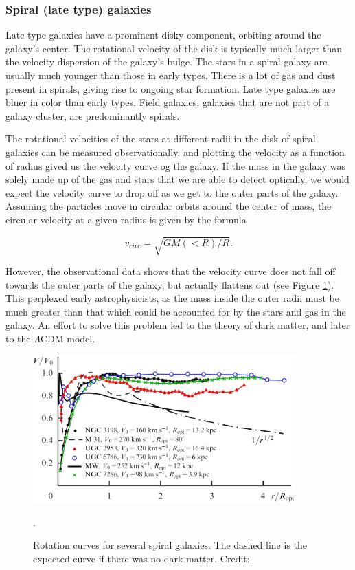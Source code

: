\subsubsection{Spiral (late type) galaxies} \label{earlies}
Late type galaxies have a prominent disky component, orbiting around the galaxy's center. The rotational velocity of the disk is typically much larger than the velocity dispersion of the galaxy's bulge. The stars in a spiral galaxy are usually much younger than those in early types. There is a lot of gas and dust present in spirals, giving rise to ongoing star formation. Late type galaxies are bluer in color than early types. Field galaxies, galaxies that are not part of a galaxy cluster, are predominantly spirals. 


The rotational velocities of the stars at different radii in the disk of spiral galaxies can be measured observationally, and plotting the velocity as a function of radius gived us the velocity curve og the galaxy. If the mass in the galaxy was solely made up of the gas and stars that we are able to detect optically, we would expect the velocity curve to drop off as we get to the outer parts of the galaxy. Assuming the particles move in circular orbits around the center of mass, the circular velocity at a given radius is given by the formula

\begin{equation}
    v_{circ} = \sqrt{GM(<R)/R}. 
\end{equation}

However, the observational data shows that the velocity curve does not fall off towards the outer parts of the galaxy, but actually flattens out (see Figure \ref{rotation_curves}). This perplexed early astrophysicists, as the mass inside the outer radii must be much greater than that which could be accounted for by the stars and gas in the galaxy. An effort to solve this problem led to the theory of dark matter, and later to the $\Lambda$CDM model.

\begin{figure}
    \centering
    \includegraphics[width=0.9\textwidth]{images/rotation_curves.png}
    \caption{Rotation curves for several spiral galaxies. The dashed line is the expected curve if there was no dark matter. Credit: \cite{Zasov2017}}.
    \label{rotation_curves}
\end{figure}

